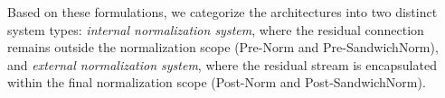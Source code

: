     Based on these formulations, we categorize the architectures into two distinct system types: \textit{internal normalization
 system}, where the residual connection remains outside the normalization scope (Pre-Norm and Pre-SandwichNorm), and \textit{external normalization
 system}, where the residual stream is encapsulated within the final normalization scope (Post-Norm and Post-SandwichNorm).
 

